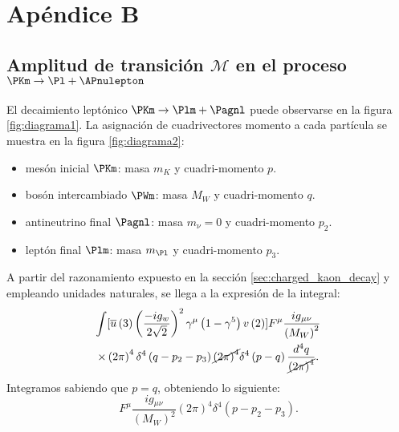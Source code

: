 \appendix
\chapter*{Apéndice B}\label{cap:B}
\setcounter{section}{0}
\renewcommand{\thesection}{B.\arabic{section}}
\setcounter{table}{0}
\renewcommand{\thetable}{B.\arabic{table}}
\setcounter{equation}{0}
\renewcommand{\theequation}{B.\arabic{equation}}

\section{Amplitud de transición $\mathcal{M}$ en el proceso $\PKm \rightarrow \Pl + \APnulepton$}\label{sec:detailed_calc}

El decaimiento leptónico $\PKm \rightarrow \Plm + \Pagnl$ puede observarse en la figura \ref{fig:diagrama1}. La asignación de cuadrivectores momento a cada partícula se muestra en la figura \ref{fig:diagrama2}:
\begin{itemize}
\setlength{\itemsep}{0.2\baselineskip}
\item mesón inicial $\PKm$: masa $m_K$ y cuadri-momento $p$.
\item bosón intercambiado $\PWm$: masa $M_W$ y cuadri-momento $q$.
\item antineutrino final $\Pagnl$: masa $m_{\nu}=0$ y cuadri-momento $p_2$.
\item leptón final $\Plm$: masa $m_{\Pl}$ y cuadri-momento $p_3$.
\end{itemize}
A partir del razonamiento expuesto en la sección \ref{sec:charged_kaon_decay} y empleando unidades naturales, se llega a la expresión de la integral:
\begin{multline}
\int[\overline{u}\left( 3\right) \left( \dfrac{-ig_w}{2\sqrt{2}}\right) ^{2}\gamma ^{\mu }\left( 1-\gamma ^{5}\right) v\left( 2\right)]F^{\mu} \dfrac{ig{_{\mu \nu}}}{\left( M_W\right)^{2}}\\ \times \left( 2\pi \right) ^{4}\delta ^{4}\left( q-p_{2}-p_{3}\right) \cancel{\left( 2\pi \right)^{4}}\delta ^{4}\left( p-q\right) \dfrac{d^{4}q}{\cancel{\left( 2\pi \right) ^{4}}} .
\end{multline}
Integramos sabiendo que $p=q$, obteniendo lo siguiente:
\begin{equation}
[\overline{u}\left( 3\right) \left( \dfrac{-ig_w}{2\sqrt{2}}\right) ^{2}\gamma ^{\mu }\left( 1-\gamma ^{5}\right) v\left( 2\right)]F^{\mu} \dfrac{ig{_{\mu \nu}}}{\left( M_W\right)^{2}}\left( 2\pi \right) ^{4}\delta ^{4}\left(p-p_{2}-p_{3}\right) .
\end{equation}
